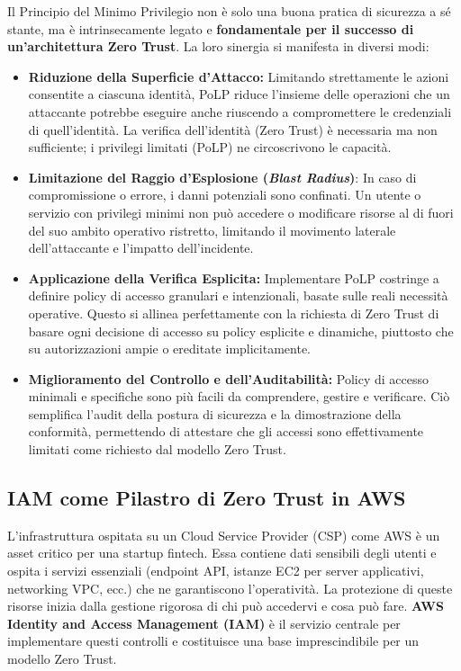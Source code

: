 Il Principio del Minimo Privilegio non è solo una buona pratica di sicurezza a sé stante, ma è intrinsecamente legato e \textbf{fondamentale per il successo di un'architettura Zero Trust}. La loro sinergia si manifesta in diversi modi:

\begin{itemize}
    \item \textbf{Riduzione della Superficie d'Attacco:} Limitando strettamente le azioni consentite a ciascuna identità, PoLP riduce l'insieme delle operazioni che un attaccante potrebbe eseguire anche riuscendo a compromettere le credenziali di quell'identità. La verifica dell'identità (Zero Trust) è necessaria ma non sufficiente; i privilegi limitati (PoLP) ne circoscrivono le capacità.
    \item \textbf{Limitazione del Raggio d'Esplosione (\textit{Blast Radius})}: In caso di compromissione o errore, i danni potenziali sono confinati. Un utente o servizio con privilegi minimi non può accedere o modificare risorse al di fuori del suo ambito operativo ristretto, limitando il movimento laterale dell'attaccante e l'impatto dell'incidente.
    \item \textbf{Applicazione della Verifica Esplicita:} Implementare PoLP costringe a definire policy di accesso granulari e intenzionali, basate sulle reali necessità operative. Questo si allinea perfettamente con la richiesta di Zero Trust di basare ogni decisione di accesso su policy esplicite e dinamiche, piuttosto che su autorizzazioni ampie o ereditate implicitamente.
    \item \textbf{Miglioramento del Controllo e dell'Auditabilità:} Policy di accesso minimali e specifiche sono più facili da comprendere, gestire e verificare. Ciò semplifica l'audit della postura di sicurezza e la dimostrazione della conformità, permettendo di attestare che gli accessi sono effettivamente limitati come richiesto dal modello Zero Trust.
\end{itemize}
\subsection{IAM come Pilastro di Zero Trust in AWS}
\label{subsec:iam-zero-trust}

L'infrastruttura ospitata su un Cloud Service Provider (CSP) come AWS è un asset critico per una startup fintech. Essa contiene dati sensibili degli utenti e ospita i servizi essenziali (endpoint API, istanze EC2 per server applicativi, networking VPC, ecc.) che ne garantiscono l'operatività. La protezione di queste risorse inizia dalla gestione rigorosa di chi può accedervi e cosa può fare. \textbf{AWS Identity and Access Management (IAM)} è il servizio centrale per implementare questi controlli e costituisce una base imprescindibile per un modello Zero Trust.

